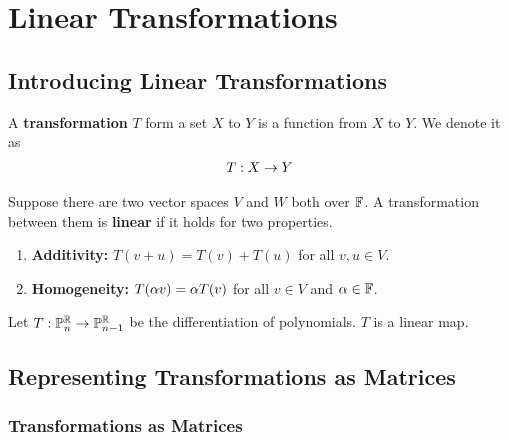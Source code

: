 \section{Linear Transformations}

\subsection{Introducing Linear Transformations}
\begin{definition}
    A \textbf{transformation} $T$ form a set $X$ to $Y$ is a function from $X$ to $Y$. We denote it as
    \begin{align*}
        T : X \rightarrow Y
    \end{align*}
\end{definition}

\begin{definition}
    Suppose there are two vector spaces $V$ and $W$ both over $\mathbb{F}$. A transformation between them is \textbf{linear} if it holds for two properties.
    \begin{enumerate}
        \item \textbf{Additivity:} $T(v + u) = T(v) + T(u)$ for all $v,u \in V$.
        \item \textbf{Homogeneity:} $T(\alpha v) = \alpha T(v)$ for all $v \in V$ and $\alpha \in \mathbb{F}$.
    \end{enumerate}
\end{definition}

\begin{lemma}
    Let $T : \mathbb{P}^{\mathbb{R}}_n \rightarrow \mathbb{P}^{\mathbb{R}}_{n - 1}$ be the differentiation of polynomials. $T$ is a linear map.
\end{lemma}

\subsection{Representing Transformations as Matrices}

\subsubsection{Transformations as Matrices}

